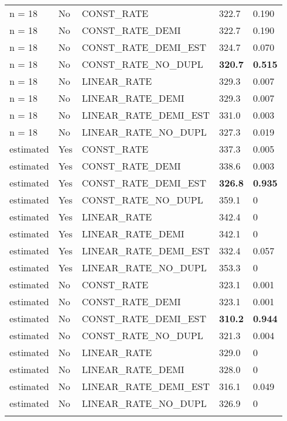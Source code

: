 \begin{longtable}{lllll}
\hline

n = 18 &
No &
CONST\_RATE &
322.7 &
0.190\\
n = 18 &
No &
CONST\_RATE\_DEMI &
322.7 &
0.190\\
n = 18 &
No &
CONST\_RATE\_DEMI\_EST &
324.7 &
0.070\\
n = 18 &
No &
CONST\_RATE\_NO\_DUPL &
\textbf{320.7} &
\textbf{0.515} \\
n = 18 &
No &
LINEAR\_RATE &
329.3 &
0.007\\
n = 18 &
No &
LINEAR\_RATE\_DEMI &
329.3 &
0.007\\
n = 18 &
No &
LINEAR\_RATE\_DEMI\_EST &
331.0 &
0.003\\
n = 18 &
No &
LINEAR\_RATE\_NO\_DUPL &
327.3 &
0.019\\


\hline

estimated &
Yes &
CONST\_RATE &
337.3 &
0.005\\
estimated &
Yes &
CONST\_RATE\_DEMI &
338.6 &
0.003\\
estimated &
Yes &
CONST\_RATE\_DEMI\_EST &
\textbf{326.8} &
\textbf{0.935}\\
estimated &
Yes &
CONST\_RATE\_NO\_DUPL &
359.1&
0\\
estimated &
Yes &
LINEAR\_RATE &
342.4 &
0\\
estimated &
Yes &
LINEAR\_RATE\_DEMI &
342.1 &
0 \\
estimated &
Yes &
LINEAR\_RATE\_DEMI\_EST &
332.4 &
0.057 \\
estimated &
Yes &
LINEAR\_RATE\_NO\_DUPL &
353.3 &
0 \\

\hline

estimated &
No &
CONST\_RATE &
323.1 &
0.001\\
estimated &
No &
CONST\_RATE\_DEMI &
323.1 &
0.001\\
estimated &
No &
CONST\_RATE\_DEMI\_EST &
\textbf{310.2} &
\textbf{0.944}\\
estimated &
No &
CONST\_RATE\_NO\_DUPL &
321.3 &
0.004\\
estimated &
No &
LINEAR\_RATE &
329.0 &
0\\
estimated &
No &
LINEAR\_RATE\_DEMI &
328.0 &
0\\
estimated &
No &
LINEAR\_RATE\_DEMI\_EST &
316.1 &
0.049\\
estimated &
No &
LINEAR\_RATE\_NO\_DUPL &
326.9 &
0\\

\hline

\label{table-dup-results}
\end{longtable}
